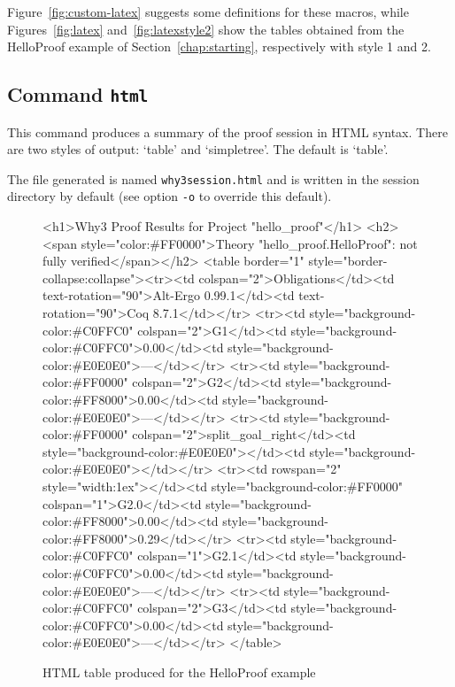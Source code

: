 Figure~\ref{fig:custom-latex} suggests some definitions for these
macros, while Figures~\ref{fig:latex} and~\ref{fig:latexstyle2} show
the tables obtained from the HelloProof example of
Section~\ref{chap:starting}, respectively with style 1 and 2.

\subsection{Command \texttt{html}}

This command produces a summary of the proof session in HTML syntax.
There are two styles of output: `table' and `simpletree'. The default is
`table'.

The file generated is named \texttt{why3session.html} and is written
in the session directory by default (see option \texttt{-o} to
override this default).

\begin{figure}[t]
\begin{center}
\end{center}
\begin{htmlonly}
\begin{rawhtml}
<h1>Why3 Proof Results for Project "hello_proof"</h1>
<h2><span style="color:#FF0000">Theory "hello_proof.HelloProof": not fully verified</span></h2>
<table border="1" style="border-collapse:collapse"><tr><td colspan="2">Obligations</td><td text-rotation="90">Alt-Ergo 0.99.1</td><td text-rotation="90">Coq 8.7.1</td></tr>
<tr><td style="background-color:#C0FFC0" colspan="2">G1</td><td style="background-color:#C0FFC0">0.00</td><td style="background-color:#E0E0E0">---</td></tr>
<tr><td style="background-color:#FF0000" colspan="2">G2</td><td style="background-color:#FF8000">0.00</td><td style="background-color:#E0E0E0">---</td></tr>
<tr><td style="background-color:#FF0000" colspan="2">split_goal_right</td><td style="background-color:#E0E0E0"></td><td style="background-color:#E0E0E0"></td></tr>
<tr><td rowspan="2" style="width:1ex"></td><td style="background-color:#FF0000" colspan="1">G2.0</td><td style="background-color:#FF8000">0.00</td><td style="background-color:#FF8000">0.29</td></tr>
<tr><td style="background-color:#C0FFC0" colspan="1">G2.1</td><td style="background-color:#C0FFC0">0.00</td><td style="background-color:#E0E0E0">---</td></tr>
<tr><td style="background-color:#C0FFC0" colspan="2">G3</td><td style="background-color:#C0FFC0">0.00</td><td style="background-color:#E0E0E0">---</td></tr>
</table>
\end{rawhtml}
\end{htmlonly}
\caption{HTML table produced for the HelloProof example}
\label{fig:html}
\end{figure}

